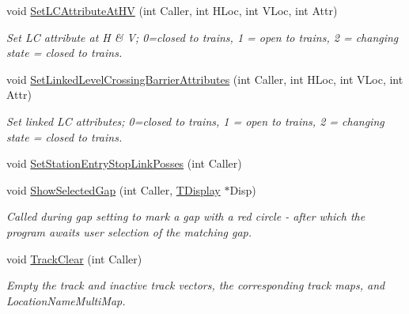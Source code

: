 \begin{DoxyCompactItemize}
void \mbox{\hyperlink{class_t_track_a43c4adf8324c465b90bad0a4dd6761a2}{Set\+L\+C\+Attribute\+At\+HV}} (int Caller, int H\+Loc, int V\+Loc, int Attr)
\begin{DoxyCompactList}\small\item\em Set LC attribute at H \& V; 0=closed to trains, 1 = open to trains, 2 = changing state = closed to trains. \end{DoxyCompactList}\item 
\mbox{\label{class_t_track_a57723388cbfcaf525bf982d8e095949e}} 
void \mbox{\hyperlink{class_t_track_a57723388cbfcaf525bf982d8e095949e}{Set\+Linked\+Level\+Crossing\+Barrier\+Attributes}} (int Caller, int H\+Loc, int V\+Loc, int Attr)
\begin{DoxyCompactList}\small\item\em Set linked LC attributes; 0=closed to trains, 1 = open to trains, 2 = changing state = closed to trains. \end{DoxyCompactList}\item 
void \mbox{\hyperlink{class_t_track_a46b69ee08436c2ff5e41673df04bcf11}{Set\+Station\+Entry\+Stop\+Link\+Posses}} (int Caller)
\item 
\mbox{\label{class_t_track_a7fe1e2c641e38da6ab3fdbf20e529d2c}} 
void \mbox{\hyperlink{class_t_track_a7fe1e2c641e38da6ab3fdbf20e529d2c}{Show\+Selected\+Gap}} (int Caller, \mbox{\hyperlink{class_t_display}{T\+Display}} $\ast$Disp)
\begin{DoxyCompactList}\small\item\em Called during gap setting to mark a gap with a red circle -\/ after which the program awaits user selection of the matching gap. \end{DoxyCompactList}\item 
\mbox{\label{class_t_track_ae6fe537bbd1e56074a358bf2c6233c71}} 
void \mbox{\hyperlink{class_t_track_ae6fe537bbd1e56074a358bf2c6233c71}{Track\+Clear}} (int Caller)
\begin{DoxyCompactList}\small\item\em Empty the track and inactive track vectors, the corresponding track maps, and Location\+Name\+Multi\+Map. \end{DoxyCompactList}\item 
\mbox{\label{class_t_track_a2d8f9445f873689b8e71d3f8efc7c7d3}} 

\end{DoxyCompactItemize}
